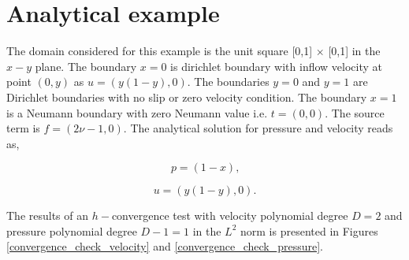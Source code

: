 \documentclass[a4paper,oneside,openright,spanish,english]{book}
\begin{document}
\section{Analytical example}

The domain considered for this example is the unit square [0,1] $\times$ [0,1] in the $x-y$ plane. 
The boundary ${x=0}$ is dirichlet boundary with inflow velocity at point $(0,y)$ as $u = (y(1-y), 0)$. The boundaries ${y = 0}$ and ${y = 1}$ are Dirichlet boundaries with no slip or zero velocity condition. The boundary ${x = 1}$ is a Neumann boundary with zero Neumann value i.e. $t = (0, 0)$. The source term is $f = (2 \nu - 1, 0)$. The analytical solution for pressure and velocity reads as,

\begin{center}

\begin{equation}
p = (1 - x) \textrm{,}
\end{equation}

\begin{equation} 
 u = (y(1-y), 0) \textrm{.}
\end{equation}

\end{center}

The results of an $h-$convergence test with velocity polynomial degree $D=2$ and pressure polynomial degree $D-1 = 1$ in the $L^2$ norm is presented in Figures \ref{convergence_check_velocity} and \ref{convergence_check_pressure}.
\end{document}
